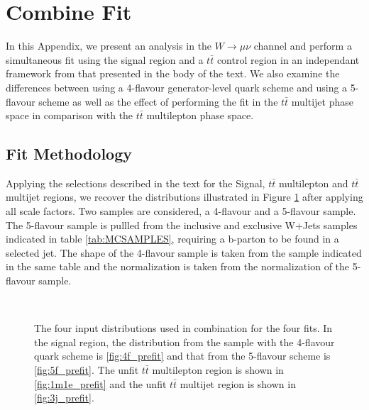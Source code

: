 \section{Combine Fit}\label{sec:CombineFit}
In this Appendix, we present an analysis in the $W\rightarrow \mu\nu$
 channel and perform a simultaneous fit using the \Wbb signal region and a $t\bar{t}$ 
 control region in an independant framework from that presented in the body of the text.
We also examine the differences between using a 4-flavour generator-level quark scheme
 and using a 5-flavour scheme as well as the effect of performing the fit in the $t\bar{t}$ 
 multijet phase space in comparison with the $t\bar{t}$ multilepton phase space.

\subsection{Fit Methodology}
Applying the selections described in the text for the Signal, $t\bar{t}$ multilepton
 and $t\bar{t}$ multijet regions, we recover the distributions illustrated in 
 Figure \ref{fig:wbbttbar_prefit} after applying all scale factors. 
Two \Wbb samples are considered, a 4-flavour and a 5-flavour sample. 
The 5-flavour sample is pullled from the inclusive and exclusive W+Jets samples 
 indicated in table \ref{tab:MCSAMPLES}, requiring a b-parton to be found in a selected jet. 
The shape of the 4-flavour sample is taken from the sample indicated in the same table
 and the normalization is taken from the normalization of the 5-flavour sample.

\begin{figure}[htb]
\center
{}
\\
\caption{
 The four input distributions used in combination for the four fits.
 In the signal region, the distribution from the \Wbb sample with the 4-flavour quark scheme
  is \ref{fig:4f_prefit} and that from the 5-flavour scheme is \ref{fig:5f_prefit}.
 The unfit $t\bar{t}$ multilepton region is shown in \ref{fig:1m1e_prefit} 
  and the unfit $t\bar{t}$ multijet region is shown in \ref{fig:3j_prefit}.
 }
\label{fig:wbbttbar_prefit}
\end{figure}

